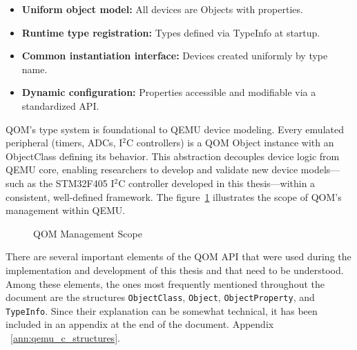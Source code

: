 \begin{itemize}
    \item \textbf{Uniform object model:             }All devices are Objects with properties.
    
    \item \textbf{Runtime type registration:        }Types defined via TypeInfo at startup.
    
    \item \textbf{Common instantiation interface:   }Devices created uniformly by type name.
    
    \item \textbf{Dynamic configuration:            }Properties accessible and modifiable via a 
                                                        standardized API.
\end{itemize}


QOM's type system is foundational to QEMU device modeling. Every 
emulated peripheral (timers, ADCs, I$^2$C controllers) is a QOM Object instance with 
an ObjectClass defining its behavior. This abstraction decouples device logic from 
QEMU core, enabling researchers to develop and validate new device models—such 
as the STM32F405 I$^2$C controller developed in this thesis—within a consistent, 
well-defined framework. The figure~\ref{fig:qom_management} illustrates the scope of QOM's management 
within QEMU.

\begin{figure}[H]
    \caption{QOM Management Scope}
    \label{fig:qom_management}
\end{figure}

There are several important elements of the QOM API that were used during the implementation and development of this thesis and that need to be understood. Among these elements, the ones most frequently mentioned throughout the document are the structures \texttt{ObjectClass}, \texttt{Object}, \texttt{ObjectProperty}, and \texttt{TypeInfo}. Since their explanation can be somewhat technical, it has been included in an appendix at the end of the document. Appendix ~\ref{ann:qemu_c_structures}.
